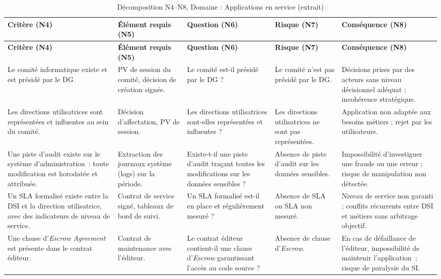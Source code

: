 \begin{longtable}{p{3.2cm}p{3cm}p{2.8cm}p{2.6cm}p{2.8cm}}
\caption{Décomposition N4--N8, Domaine : Applications en service (extrait)} \\
\toprule
\textbf{Critère (N4)} & \textbf{Élément requis (N5)} & \textbf{Question (N6)} & \textbf{Risque (N7)} & \textbf{Conséquence (N8)} \\
\midrule
\endfirsthead
\toprule
\textbf{Critère (N4)} & \textbf{Élément requis (N5)} & \textbf{Question (N6)} & \textbf{Risque (N7)} & \textbf{Conséquence (N8)} \\
\midrule
\endhead
\bottomrule
\endlastfoot

Le comité informatique existe et est présidé par le DG. &
PV de session du comité, décision de création signée. &
Le comité est-il présidé par le DG ? &
Le comité n'est pas présidé par le DG. &
Décisions prises par des acteurs sans niveau décisionnel adéquat ; incohérence stratégique. \\
\addlinespace

Les directions utilisatrices sont représentées et influentes au sein du comité. &
Décision d'affectation, PV de session. &
Les directions utilisatrices sont-elles représentées et influentes ? &
Les directions utilisatrices ne sont pas représentées. &
Application non adaptée aux besoins métiers ; rejet par les utilisateurs. \\
\addlinespace

Une piste d'audit existe sur le système d'administration~: toute modification est horodatée et attribuée. &
Extraction des journaux système (logs) sur la période. &
Existe-t-il une piste d'audit traçant toutes les modifications sur les données sensibles ? &
Absence de piste d'audit sur les données sensibles. &
Impossibilité d'investiguer une fraude ou une erreur ; risque de manipulation non détectée. \\
\addlinespace

Un SLA formalisé existe entre la DSI et la direction utilisatrice, avec des indicateurs de niveau de service. &
Contrat de service signé, tableaux de bord de suivi. &
Un SLA formalisé est-il en place et régulièrement mesuré ? &
Absence de SLA ou SLA non mesuré. &
Niveau de service non garanti ; conflits récurrents entre DSI et métiers sans arbitrage objectif. \\
\addlinespace

Une clause d'\textit{Escrow Agreement} est présente dans le contrat éditeur. &
Contrat de maintenance avec l'éditeur. &
Le contrat éditeur contient-il une clause d'\textit{Escrow} garantissant l'accès au code source ? &
Absence de clause d'\textit{Escrow}. &
En cas de défaillance de l'éditeur, impossibilité de maintenir l'application~; risque de paralysie du SI. \\

\end{longtable}

